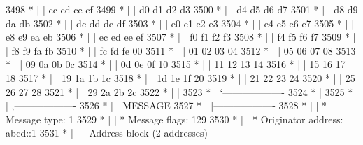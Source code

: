 \begin{DoxyCode}
3498 \textcolor{comment}{         * |    |                           cc  cd  ce  cf}
3499 \textcolor{comment}{         * |    |                           d0  d1  d2  d3}
3500 \textcolor{comment}{         * |    |                           d4  d5  d6  d7}
3501 \textcolor{comment}{         * |    |                           d8  d9  da  db}
3502 \textcolor{comment}{         * |    |                           dc  dd  de  df}
3503 \textcolor{comment}{         * |    |                           e0  e1  e2  e3}
3504 \textcolor{comment}{         * |    |                           e4  e5  e6  e7}
3505 \textcolor{comment}{         * |    |                           e8  e9  ea  eb}
3506 \textcolor{comment}{         * |    |                           ec  ed  ee  ef}
3507 \textcolor{comment}{         * |    |                           f0  f1  f2  f3}
3508 \textcolor{comment}{         * |    |                           f4  f5  f6  f7}
3509 \textcolor{comment}{         * |    |                           f8  f9  fa  fb}
3510 \textcolor{comment}{         * |    |                           fc  fd  fe  00}
3511 \textcolor{comment}{         * |    |                           01  02  03  04}
3512 \textcolor{comment}{         * |    |                           05  06  07  08}
3513 \textcolor{comment}{         * |    |                           09  0a  0b  0c}
3514 \textcolor{comment}{         * |    |                           0d  0e  0f  10}
3515 \textcolor{comment}{         * |    |                           11  12  13  14}
3516 \textcolor{comment}{         * |    |                           15  16  17  18}
3517 \textcolor{comment}{         * |    |                           19  1a  1b  1c}
3518 \textcolor{comment}{         * |    |                           1d  1e  1f  20}
3519 \textcolor{comment}{         * |    |                           21  22  23  24}
3520 \textcolor{comment}{         * |    |                           25  26  27  28}
3521 \textcolor{comment}{         * |    |                           29  2a  2b  2c}
3522 \textcolor{comment}{         * |    |}
3523 \textcolor{comment}{         * |    `-------------------}
3524 \textcolor{comment}{         * |}
3525 \textcolor{comment}{         * |    ,-------------------}
3526 \textcolor{comment}{         * |    |  MESSAGE}
3527 \textcolor{comment}{         * |    |-------------------}
3528 \textcolor{comment}{         * |    | * Message type:       1}
3529 \textcolor{comment}{         * |    | * Message flags:  129}
3530 \textcolor{comment}{         * |    | * Originator address: abcd::1}
3531 \textcolor{comment}{         * |    | - Address block (2 addresses)}

\end{DoxyCode}
